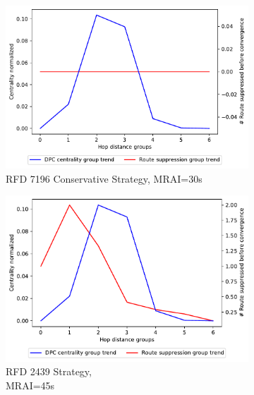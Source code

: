 \begin{figure}[H]
\begin{subfigure}[b]{0.325\textwidth}
         \centering
         \includegraphics[width=\textwidth]{images/RFD/miceVSelephants/MultiMRAI/30/mice/cisco_1000_RFD_7196_conservative_nodeConvergence_centVSsup_trend.pdf}
         \caption{RFD 7196 Conservative Strategy, MRAI=30s}
         \label{fig:1000_7196RFDC_centVSsup_mices}
     \end{subfigure}
     \vfill
     \begin{subfigure}[b]{0.325\textwidth}
         \centering
         \includegraphics[width=\textwidth]{images/RFD/miceVSelephants/MultiMRAI/45/mice/cisco_1000_RFD_nodeConvergence_centVSsup_trend.pdf}
         \caption{RFD 2439 Strategy, \\MRAI=45s}
         \label{fig:1000_2439RFD_centVSsup_mices}
     \end{subfigure}
     \hfill
     \begin{subfigure}[b]{0.325\textwidth}

\end{subfigure}
\end{figure}

